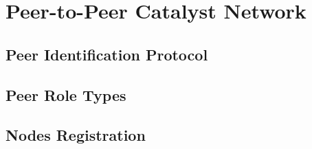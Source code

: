 \documentclass[a4paper, 12pt]{book}
\begin{document}





\chapter{Peer-to-Peer Catalyst Network} \label{Cha:NAPI}



\section{Peer Identification Protocol}\label{Sec:PIP}

\section{Peer Role Types}\label{Sec:PRT}

\section{Nodes Registration}\label{Sec:Reg}
\end{document}
